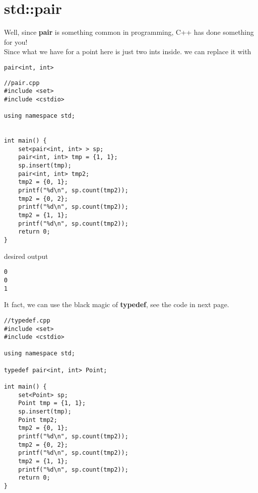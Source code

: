 \documentclass{article}
\begin{document}
\section{std::pair}
Well, since \textbf{pair} is something common in programming, C++ has done something for you!\\
Since what we have for a point here is just two ints inside. we can replace it with
\begin{lstlisting}
pair<int, int>
\end{lstlisting}
\begin{lstlisting}
//pair.cpp
#include <set>
#include <cstdio>

using namespace std;


int main() {
    set<pair<int, int> > sp;
    pair<int, int> tmp = {1, 1};
    sp.insert(tmp);
    pair<int, int> tmp2;
    tmp2 = {0, 1};
    printf("%d\n", sp.count(tmp2));
    tmp2 = {0, 2};
    printf("%d\n", sp.count(tmp2));
    tmp2 = {1, 1};
    printf("%d\n", sp.count(tmp2));
    return 0;
}
\end{lstlisting}
desired output
\begin{lstlisting}
0
0
1
\end{lstlisting}
It fact, we can use the black magic of \textbf{typedef}, see the code in next page.
\newpage
\begin{lstlisting}
//typedef.cpp
#include <set>
#include <cstdio>

using namespace std;

typedef pair<int, int> Point;

int main() {
    set<Point> sp;
    Point tmp = {1, 1};
    sp.insert(tmp);
    Point tmp2;
    tmp2 = {0, 1};
    printf("%d\n", sp.count(tmp2));
    tmp2 = {0, 2};
    printf("%d\n", sp.count(tmp2));
    tmp2 = {1, 1};
    printf("%d\n", sp.count(tmp2));
    return 0;
}
\end{lstlisting}
\end{document}

